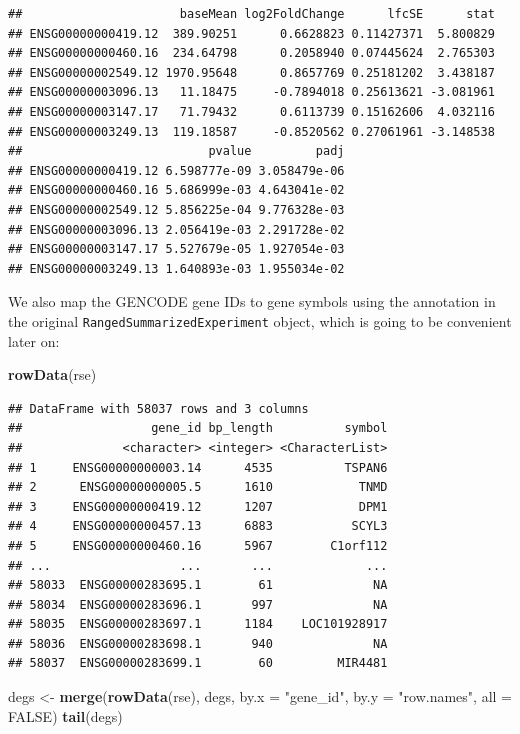 \documentclass[9pt,a4paper,]{extarticle}
\newenvironment{Shaded}{\begin{snugshade}}{\end{snugshade}}
\newcommand{\KeywordTok}[1]{\textcolor[rgb]{0.13,0.29,0.53}{\textbf{#1}}}
\newcommand{\DataTypeTok}[1]{\textcolor[rgb]{0.13,0.29,0.53}{#1}}
\newcommand{\StringTok}[1]{\textcolor[rgb]{0.31,0.60,0.02}{#1}}
\newcommand{\OtherTok}[1]{\textcolor[rgb]{0.56,0.35,0.01}{#1}}
\newcommand{\NormalTok}[1]{#1}
\begin{document}
\begin{verbatim}
##                      baseMean log2FoldChange      lfcSE      stat
## ENSG00000000419.12  389.90251      0.6628823 0.11427371  5.800829
## ENSG00000000460.16  234.64798      0.2058940 0.07445624  2.765303
## ENSG00000002549.12 1970.95648      0.8657769 0.25181202  3.438187
## ENSG00000003096.13   11.18475     -0.7894018 0.25613621 -3.081961
## ENSG00000003147.17   71.79432      0.6113739 0.15162606  4.032116
## ENSG00000003249.13  119.18587     -0.8520562 0.27061961 -3.148538
##                          pvalue         padj
## ENSG00000000419.12 6.598777e-09 3.058479e-06
## ENSG00000000460.16 5.686999e-03 4.643041e-02
## ENSG00000002549.12 5.856225e-04 9.776328e-03
## ENSG00000003096.13 2.056419e-03 2.291728e-02
## ENSG00000003147.17 5.527679e-05 1.927054e-03
## ENSG00000003249.13 1.640893e-03 1.955034e-02
\end{verbatim}

We also map the GENCODE gene IDs to gene symbols using the annotation in the original \texttt{RangedSummarizedExperiment} object, which is going to be convenient later on:

\begin{Shaded}
\begin{Highlighting}[]
\KeywordTok{rowData}\NormalTok{(rse)}
\end{Highlighting}
\end{Shaded}

\begin{verbatim}
## DataFrame with 58037 rows and 3 columns
##                  gene_id bp_length          symbol
##              <character> <integer> <CharacterList>
## 1     ENSG00000000003.14      4535          TSPAN6
## 2      ENSG00000000005.5      1610            TNMD
## 3     ENSG00000000419.12      1207            DPM1
## 4     ENSG00000000457.13      6883           SCYL3
## 5     ENSG00000000460.16      5967        C1orf112
## ...                  ...       ...             ...
## 58033  ENSG00000283695.1        61              NA
## 58034  ENSG00000283696.1       997              NA
## 58035  ENSG00000283697.1      1184    LOC101928917
## 58036  ENSG00000283698.1       940              NA
## 58037  ENSG00000283699.1        60         MIR4481
\end{verbatim}

\begin{Shaded}
\begin{Highlighting}[]
\NormalTok{degs <-}\StringTok{ }\KeywordTok{merge}\NormalTok{(}\KeywordTok{rowData}\NormalTok{(rse), degs, }\DataTypeTok{by.x =} \StringTok{"gene_id"}\NormalTok{, }\DataTypeTok{by.y =} \StringTok{"row.names"}\NormalTok{, }\DataTypeTok{all =} \OtherTok{FALSE}\NormalTok{)}
\KeywordTok{tail}\NormalTok{(degs)}
\end{Highlighting}
\end{Shaded}
\end{document}
